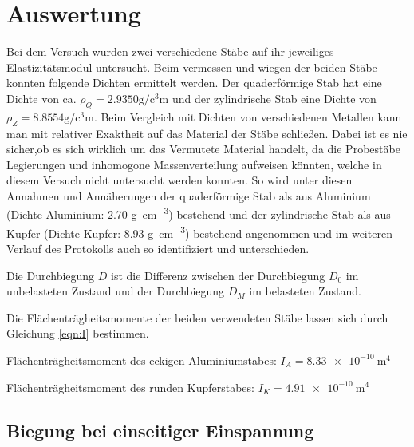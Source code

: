 \section{Auswertung}
\label{sec:Auswertung}

Bei dem Versuch wurden zwei verschiedene Stäbe auf ihr jeweiliges Elastizitätsmodul untersucht.
Beim vermessen und wiegen der beiden Stäbe konnten folgende Dichten ermittelt werden.
Der quaderförmige Stab hat eine Dichte von ca. $\rho_Q = 2.9350 \si{\gram\per\cubic\centi\meter}$
und der zylindrische Stab eine Dichte von $\rho_Z = 8.8554 \si{\gram\per\cubic\centi\meter}$.
Beim Vergleich mit Dichten von verschiedenen Metallen kann man mit relativer Exaktheit auf das Material
der Stäbe schließen. Dabei ist es nie sicher,ob es sich wirklich um das Vermutete Material handelt, 
da die Probestäbe Legierungen und inhomogone Massenverteilung aufweisen könnten,
welche in diesem Versuch nicht untersucht werden konnten. So wird unter diesen Annahmen und Annäherungen der quaderförmige Stab als aus Aluminium (Dichte Aluminium: 2.70 \si{\gram\per\cubic\centi\meter}\cite{taschenbuch_physik}) bestehend und der zylindrische Stab als aus Kupfer (Dichte Kupfer: 8.93 \si{\gram\per\cubic\centi\meter}\cite{taschenbuch_physik}) bestehend angenommen und im weiteren Verlauf des Protokolls auch so identifiziert und unterschieden.



Die Durchbiegung $D$ ist die Differenz zwischen der Durchbiegung $D_0$ im unbelasteten Zustand und der
Durchbiegung $D_M$ im belasteten Zustand.

Die Flächenträgheitsmomente der beiden verwendeten Stäbe lassen sich durch Gleichung \eqref{eqn:I} bestimmen. 


Flächenträgheitsmoment des eckigen Aluminiumstabes: $I_A = \SI{8.33e-10}{\meter\tothe{4}}$


Flächenträgheitsmoment des runden Kupferstabes: $I_K = \SI{4.91e-10}{\meter\tothe{4}} $



\subsection{Biegung bei einseitiger Einspannung}



